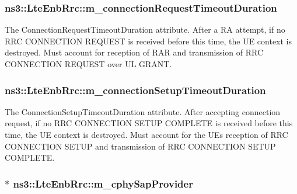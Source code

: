 \subsubsection[{\texorpdfstring{m\+\_\+connection\+Request\+Timeout\+Duration}{m_connectionRequestTimeoutDuration}}]{ ns3\+::\+Lte\+Enb\+Rrc\+::m\+\_\+connection\+Request\+Timeout\+Duration\hspace{0.3cm}{\ttfamily [private]}}\hypertarget{classns3_1_1LteEnbRrc_a3dba971d1d2ba0891779c9860b60345b}{}\label{classns3_1_1LteEnbRrc_a3dba971d1d2ba0891779c9860b60345b}
The {\ttfamily Connection\+Request\+Timeout\+Duration} attribute. After a RA attempt, if no R\+RC C\+O\+N\+N\+E\+C\+T\+I\+ON R\+E\+Q\+U\+E\+ST is received before this time, the UE context is destroyed. Must account for reception of R\+AR and transmission of R\+RC C\+O\+N\+N\+E\+C\+T\+I\+ON R\+E\+Q\+U\+E\+ST over UL G\+R\+A\+NT. 
\subsubsection[{\texorpdfstring{m\+\_\+connection\+Setup\+Timeout\+Duration}{m_connectionSetupTimeoutDuration}}]{ ns3\+::\+Lte\+Enb\+Rrc\+::m\+\_\+connection\+Setup\+Timeout\+Duration\hspace{0.3cm}{\ttfamily [private]}}\hypertarget{classns3_1_1LteEnbRrc_a6709d1de2b719fa9722b7bdbf0e56176}{}\label{classns3_1_1LteEnbRrc_a6709d1de2b719fa9722b7bdbf0e56176}
The {\ttfamily Connection\+Setup\+Timeout\+Duration} attribute. After accepting connection request, if no R\+RC C\+O\+N\+N\+E\+C\+T\+I\+ON S\+E\+T\+UP C\+O\+M\+P\+L\+E\+TE is received before this time, the UE context is destroyed. Must account for the UE\textquotesingle{}s reception of R\+RC C\+O\+N\+N\+E\+C\+T\+I\+ON S\+E\+T\+UP and transmission of R\+RC C\+O\+N\+N\+E\+C\+T\+I\+ON S\+E\+T\+UP C\+O\+M\+P\+L\+E\+TE. 
\subsubsection[{\texorpdfstring{m\+\_\+cphy\+Sap\+Provider}{m_cphySapProvider}}]{$\ast$ ns3\+::\+Lte\+Enb\+Rrc\+::m\+\_\+cphy\+Sap\+Provider\hspace{0.3cm}{\ttfamily [private]}}\hypertarget{classns3_1_1LteEnbRrc_ad0011468217726419587089658cd7352}{}\label{classns3_1_1LteEnbRrc_ad0011468217726419587089658cd7352}


